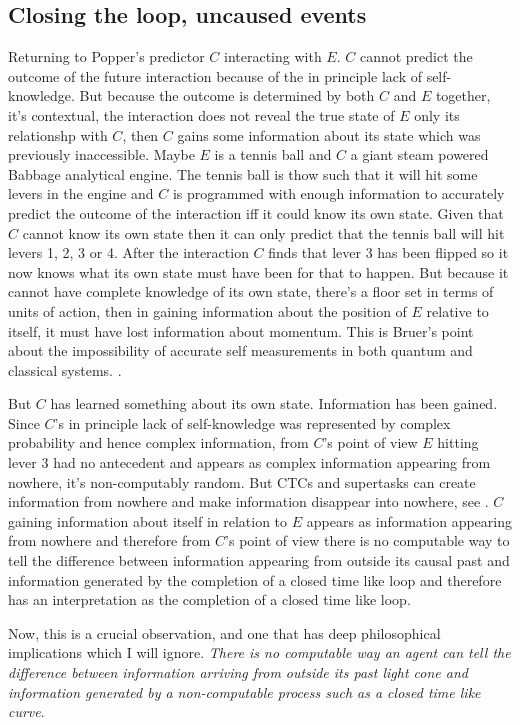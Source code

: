 \subsection{Closing the loop, uncaused events}
Returning to Popper's predictor $C$ interacting with $E$. $C$ cannot predict the outcome of the
future interaction because of the in principle lack of self-knowledge. But because the outcome
is determined by both $C$ and $E$ together, it's contextual, the interaction does not reveal the
true state of $E$ only its relationshp with $C$, then $C$ gains some information about its state
which was previously inaccessible. Maybe $E$ is a tennis ball and $C$ a giant steam powered
Babbage analytical engine. The tennis ball is thow such that it will hit some levers in the
engine and $C$ is programmed with enough information to accurately predict the outcome of the
interaction iff it could know its own state. Given that $C$ cannot know its own state then it
can only predict that the tennis ball will hit levers 1, 2, 3 or 4. After the interaction $C$
finds that lever 3 has been flipped so it now knows what its own state must have been for that
to happen. But because it cannot have complete knowledge of its own state, there's a floor set
in terms of units of action, then in gaining information about the position of $E$ relative to
itself, it must have lost information about momentum. This is Bruer's point about the
impossibility of accurate self measurements in both quantum and classical systems.
\autocite{Breuer1995}.

But $C$ has learned something about its own state. Information has been gained. Since $C$'s in
principle lack of self-knowledge was represented by complex probability and hence complex
information, from $C$'s point of view $E$ hitting lever 3 had no antecedent and appears as
complex information appearing from nowhere, it's non-computably random. But CTCs and supertasks
can create information from nowhere and make information disappear into nowhere, see
\autocite{Deutsch_91, Laraudogoitia_1997, Laraudogoitia1998}. $C$ gaining information about
itself in relation to $E$ appears as information appearing from nowhere and therefore from $C$'s
point of view there is no computable way to tell the difference between information appearing
from outside its causal past and information generated by the completion of a closed time like
loop and therefore has an interpretation as the completion of a closed time like loop.

Now, this is a crucial observation, and one that has deep philosophical implications which I
will ignore. \label{prop:self-creation}
\emph{There is no computable way an agent can tell the difference between information arriving from outside its past light cone and information generated by a non-computable process such as a closed time like curve}.


